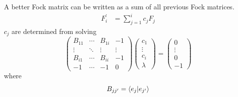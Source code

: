 \documentclass[final,3p,times,twocolumn]{elsarticle}
\begin{document}
A better Fock matrix can be written as a sum of all previous Fock matrices.
\begin{align} \label{eq:diisnewF}
F_i^\prime & = \sum_{j=1}^i c_j F_j 
\end{align}
$c_j$ are determined from solving
\begin{equation}\label{eq:diislinsys}
\begin{pmatrix} B_{11} & \cdots & B_{1i} & -1 \\
\vdots & \ddots & \vdots & \vdots \\
B_{i1} & \cdots & B_{ii} & -1 \\
-1 & \cdots & -1 & 0 \end{pmatrix}
\begin{pmatrix} c_1 \\ \vdots \\ c_i \\ \lambda \end{pmatrix} = \begin{pmatrix} 0 \\ \vdots \\ 0 \\ -1 \end{pmatrix}
\end{equation}
where
\begin{equation} \label{eq:diisB}
B_{jj^\prime} = \bra{e_j}\ket{e_{j^\prime }}
\end{equation}
\end{document}
